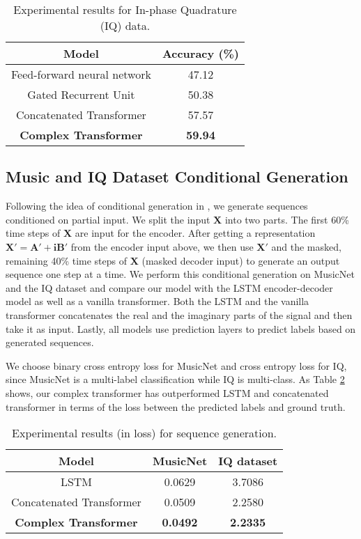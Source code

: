 \documentclass{article}
\def\vi{{\mathbf i}}
\def\mX{{\mathbf X}}
\def\mA{{\mathbf A}}
\def\mB{{\mathbf B}}
\begin{document}
\begin{table}
\centering
\caption{Experimental results for In-phase Quadrature (IQ) data.}
\begin{tabular}{c c}
    \toprule
    Model & Accuracy (\%)  \\
    \midrule
    Feed-forward neural network & 47.12 \\
    Gated Recurrent Unit & 50.38 \\
    Concatenated Transformer & 57.57 \\
    \textbf{Complex Transformer} & \textbf{59.94} \\
    \bottomrule
\end{tabular}
\label{tab:result_iq}
\end{table}

\subsection{Music and IQ Dataset Conditional Generation}



Following the idea of conditional generation in \cite{huang2018music}, we generate sequences conditioned on partial input. We split the input $\mX$ into two parts. The first 60\% time steps of $\mX$ are input for the encoder. After getting a representation $\mX' = \mA' + \vi \mB'$ from the encoder input above, we then use $\mX'$ and the masked, remaining 40\% time steps of $\mX$ (masked decoder input) to generate an output sequence one step at a time. We perform this conditional generation on MusicNet and the IQ dataset and compare our model with the LSTM encoder-decoder model \cite{hochreiter1997long} as well as a vanilla transformer. Both the LSTM and the vanilla transformer concatenates the real and the imaginary parts of the signal and then take it as input. Lastly, all models use prediction layers to predict labels based on generated sequences. 

We choose binary cross entropy loss for MusicNet and cross entropy loss for IQ, since MusicNet is a multi-label classification while IQ is multi-class. As Table \ref{tab:result_gen} shows, our complex transformer has outperformed LSTM and concatenated transformer in terms of the loss between the predicted labels and ground truth. 


\begin{table}[H]
    \centering
    \caption{Experimental results (in loss) for sequence generation.}
    \begin{tabular}{c c c}
        \toprule
        Model & MusicNet & IQ dataset   \\
        \midrule
        LSTM & 0.0629 & 3.7086 \\
        Concatenated Transformer & 0.0509 & 2.2580 \\
        \textbf{Complex Transformer} & \textbf{0.0492} & \textbf{2.2335} \\
        \bottomrule
    \end{tabular}
    \label{tab:result_gen}
\end{table}
\end{document}
